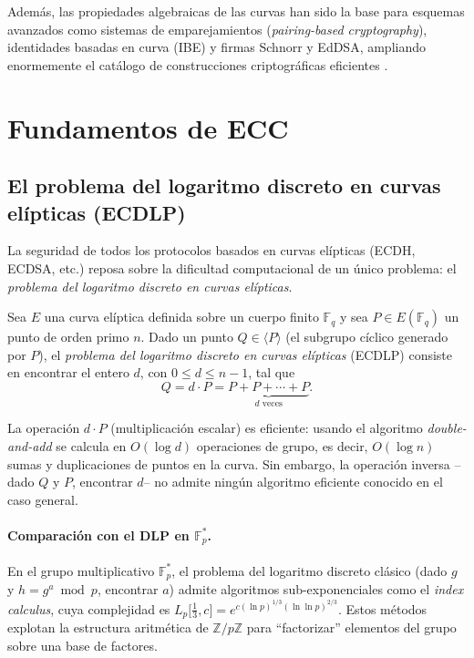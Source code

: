 Además, las propiedades algebraicas de las curvas han sido la base para esquemas avanzados como sistemas de emparejamientos (\textit{pairing-based cryptography}), identidades basadas en curva (IBE) y firmas Schnorr y EdDSA, ampliando enormemente el catálogo de construcciones criptográficas eficientes \cite{boneh2003ibe}.


\section{Fundamentos de ECC}
\label{sec:ecc-fundamentos}

\subsection{El problema del logaritmo discreto en curvas elípticas (ECDLP)}
\label{subsec:ecdlp}

La seguridad de todos los protocolos basados en curvas elípticas (ECDH, ECDSA, etc.) reposa sobre la dificultad computacional de un único problema: el \emph{problema del logaritmo discreto en curvas elípticas}.

\begin{definicion}[ECDLP]
\label{def:ecdlp}
Sea $E$ una curva elíptica definida sobre un cuerpo finito $\mathbb{F}_q$ y sea $P \in E(\mathbb{F}_q)$ un punto de orden primo $n$. Dado un punto $Q \in \langle P \rangle$ (el subgrupo cíclico generado por $P$), el \emph{problema del logaritmo discreto en curvas elípticas} (ECDLP) consiste en encontrar el entero $d$, con $0 \leq d \leq n-1$, tal que
\[
    Q = d \cdot P = \underbrace{P + P + \cdots + P}_{d \text{ veces}}.
\]
\end{definicion}

La operación $d \cdot P$ (multiplicación escalar) es eficiente: usando el algoritmo \textit{double-and-add} se calcula en $O(\log d)$ operaciones de grupo, es decir, $O(\log n)$ sumas y duplicaciones de puntos en la curva. Sin embargo, la operación inversa --dado $Q$ y $P$, encontrar $d$-- no admite ningún algoritmo eficiente conocido en el caso general.

\paragraph{Comparación con el DLP en $\mathbb{F}_p^*$.}
En el grupo multiplicativo $\mathbb{F}_p^*$, el problema del logaritmo discreto clásico (dado $g$ y $h = g^a \bmod p$, encontrar $a$) admite algoritmos sub-exponenciales como el \textit{index calculus}, cuya complejidad es $L_p\big[\tfrac{1}{3}, c\big] = e^{c(\ln p)^{1/3}(\ln \ln p)^{2/3}}$. Estos métodos explotan la estructura aritmética de $\mathbb{Z}/p\mathbb{Z}$ para ``factorizar'' elementos del grupo sobre una base de factores.

